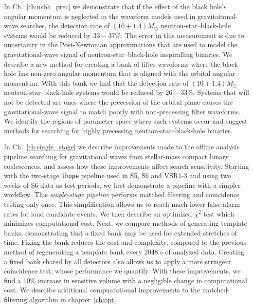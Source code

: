 In Ch.~\ref{ch:nsbh_prec} we demonstrate that if the effect of the black
hole's angular momentum is neglected in the waveform models used in
gravitational-wave searches, the detection rate of $(10+1.4)M_{\odot}$
neutron-star--black-hole
systems would be reduced by $33 - 37\%$. The error in this measurement is due
to uncertainty in the Post-Newtonian approximations that are used to model the
gravitational-wave signal of neutron-star--black-hole inspiralling binaries. We
describe a new method for creating a bank of filter waveforms where the black
hole has non-zero angular momentum that is aligned with the orbital angular
momentum. With this bank we find that the detection rate of $(10+1.4)M_{\odot}$
neutron-star--black-hole systems would be reduced by $26-33\%$. Systems that
will not be detected are ones where the precession of the orbital plane causes
the gravitational-wave signal to match poorly with non-precessing filter
waveforms. We identify the regions of parameter space where such systems occur
and suggest methods for searching for highly precessing
neutron-star--black-hole binaries.

In Ch.~\ref{ch:single_stage} we describe improvements
made to the offline analysis pipeline searching for gravitational waves from
stellar-mass compact binary coalescences, and assess how these improvements
affect search sensitivity. Starting with the two-stage \texttt{ihope} pipeline
used in S5, S6 and VSR1-3 and using two weeks of S6 data as test periods,
we first demonstrate a pipeline with a simpler workflow. This
\emph{single-stage pipeline} performs matched filtering and coincidence
testing only once. This simplification allows us to reach much lower
false-alarm rates for loud candidate events. We then describe an optimized
$\chi^2$ test which minimizes computational cost. Next, we compare methods of
generating template banks, demonstrating that a fixed bank may be used for
extended stretches of time. Fixing the bank reduces the cost and complexity,
compared to the previous method of regenerating a template bank every 2048 s
of analyzed data. Creating a fixed bank shared by all detectors also allows us
to apply a more stringent coincidence test, whose performance we quantify.
With these improvements, we find a 10\% increase in sensitive volume
with a negligible change in computational cost. We describe additional
compuatational improvements to the matched-filtering algorithm in chapter~\ref{ch:opt}.

